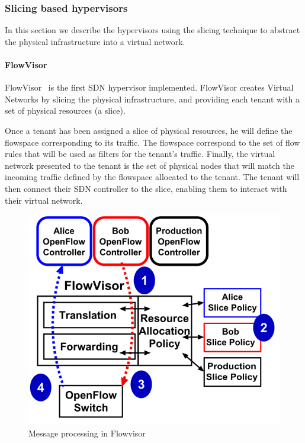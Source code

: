 \subsubsection{Slicing based hypervisors}
\label{sec:existing-nhv}
In this section we describe the hypervisors using the slicing technique to abstract the physical infrastructure into a virtual network.

\paragraph{FlowVisor}

FlowVisor~\cite{FlowVisor-Sherwood2009} is the first SDN hypervisor implemented.
FlowVisor creates Virtual Networks by slicing the physical infrastructure, and providing each tenant with a set of physical resources (\ie a slice).

Once a tenant has been assigned a slice of physical resources, he will define the flowspace 
corresponding to its traffic.
The flowspace correspond to the set of flow rules that will be used as filters for the tenant's traffic.
Finally, the virtual network presented to the tenant is the set of physical nodes that will match the incoming traffic defined by the flowspace allocated to the tenant.
The tenant will then connect their SDN controller to the slice, enabling them to interact with their virtual network.



\begin{figure}[h]
    \centering
    \includegraphics[scale=0.6]{figures/flowvisor-process.png}
    \caption{Message processing in Flowvisor~\cite{FlowVisor-Sherwood2009}}
    \label{fig:flowvisor-process}
\end{figure}


